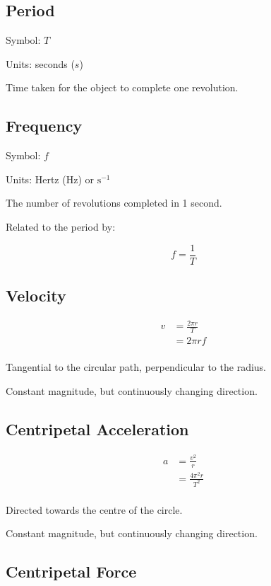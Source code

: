 \documentclass[a4paper,11pt]{article}
\begin{document}
\subsection{Period}

Symbol: $T$

Units: seconds ($s$)

Time taken for the object to complete one revolution.


\subsection{Frequency}

Symbol: $f$

Units: Hertz (Hz) or $\mbox{s}^{-1}$

The number of revolutions completed in 1 second.

Related to the period by:

$$
f = \frac{1}{T}
$$


\subsection{Velocity}

$$
\begin{aligned}
v & = \frac{2\pi r}{T} \\
& = 2\pi r f \\
\end{aligned}
$$

Tangential to the circular path, perpendicular to the radius.

Constant magnitude, but continuously changing direction.


\subsection{Centripetal Acceleration}

$$
\begin{aligned}
a & = \frac{v^2}{r} \\
& = \frac{4 \pi^2 r}{T^2} \\
\end{aligned}
$$

Directed towards the centre of the circle.

Constant magnitude, but continuously changing direction.


\subsection{Centripetal Force}
\end{document}
